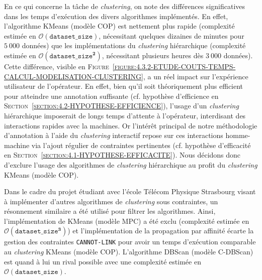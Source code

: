 			En ce qui concerne la tâche de \textit{clustering}, on note des différences significatives dans les temps d'exécution des divers algorithmes implémentés.
			En effet, l'algorithme KMeans (modèle COP) est nettement plus rapide (complexité estimée en $ \mathcal{O}(\texttt{dataset\_size}) $, nécessitant quelques dizaines de minutes pour $5~000$ données) que les implémentations du \textit{clustering} hiérarchique (complexité estimée en $ \mathcal{O}(\texttt{dataset\_size}^{\textbf{2}}) $, nécessitant plusieurs heures dès $3~000$ données).
			Cette différence, visible en \textsc{Figure~\ref{figure:4.3.2-ETUDE-COUTS-TEMPS-CALCUL-MODELISATION-CLUSTERING}}, a un réel impact sur l'expérience utilisateur de l'opérateur.
			En effet, bien qu'il soit théoriquement plus efficient pour atteindre une annotation suffisante (cf. hypothèse d'efficience en \textsc{Section~\ref{section:4.2-HYPOTHESE-EFFICIENCE}}), l'usage d'un \textit{clustering} hiérarchique imposerait de longs temps d'attente à l'opérateur, interdisant des interactions rapides avec la machines.
			Or l'intérêt principal de notre méthodologie d'annotation à l'aide du \textit{clustering} interactif repose sur ces interactions homme-machine via l'ajout régulier de contraintes pertinentes (cf. hypothèse d'efficacité en \textsc{Section~\ref{section:4.1-HYPOTHESE-EFFICACITE}}).
			Nous décidons donc d'exclure l'usage des algorithmes de \textit{clustering} hiérarchique au profit du \textit{clustering} KMeans (modèle COP).
			
			\begin{leftBarInformation}
				Dans le cadre du projet étudiant avec l'école Télécom Physique Strasbourg visant à implémenter d'autres algorithmes de \textit{clustering} sous contraintes, un résonnement similaire a été utilisé pour filtrer les algorithmes. Ainsi, l'implémentation de KMeans (modèle MPC) a été exclu (complexité estimée en $ \mathcal{O}(\texttt{dataset\_size}^{\textbf{3}}) $) et l'implémentation de la propagation par affinité écarte la gestion des contraintes \texttt{CANNOT-LINK} pour avoir un temps d'exécution comparable au \textit{clustering} KMeans (modèle COP). L'algorithme DBScan (modèle C-DBScan) est quand à lui un rival possible avec une complexité estimée en $ \mathcal{O}(\texttt{dataset\_size}) $.
			\end{leftBarInformation}
			
